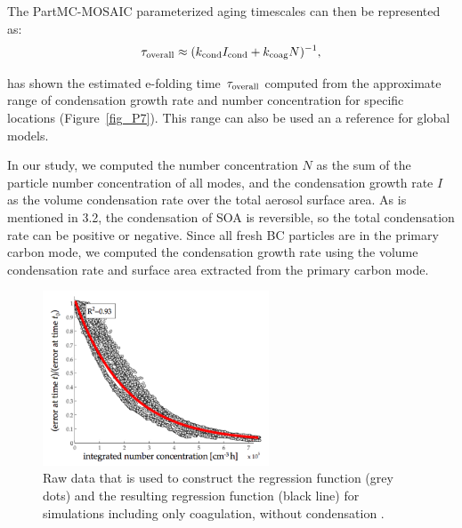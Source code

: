 \documentclass[12pt, fullpage]{uiucthesis2009_2}
\begin{document}
	The PartMC-MOSAIC parameterized aging timescales can then be represented as:
	\begin{align}
	\tau_{\rm overall} \approx (k_{\rm cond}I_{\rm cond} + k_{\rm coag}N)^{-1},
	\end{align}
	
	\citet{Fierce2016} has shown the estimated e-folding time $\tau_{\rm overall}$ computed from the approximate range of condensation growth rate and number concentration for specific locations (Figure~\ref{fig_P7}). This range can also be used an a reference for global models. 
	
	In our study, we computed the number concentration $N$ as the sum of the particle number concentration of all modes, and the condensation growth rate $I$ as the volume condensation rate over the total aerosol surface area. As is mentioned in 3.2, the condensation of SOA is reversible, so the total condensation rate can be positive or negative. Since all fresh BC particles are in the primary carbon mode, we computed the condensation growth rate using the volume condensation rate and surface area extracted from the primary carbon mode. 
	
	\begin{figure}[h] 
		\begin{center}
			\includegraphics[width = 0.6\textwidth]{Figure02}
			\caption[Raw data that is used to construct the regression function (grey dots) and the resulting regression function (black line) for simulations including only coagulation, without condensation \citep{Fierce2016}]{\label{fig_P2}Raw data that is used to construct the regression function (grey dots) and the resulting regression function (black line) for simulations including only coagulation, without condensation \citep{Fierce2016}.}
		\end{center}
	\end{figure}
	
\end{document}
